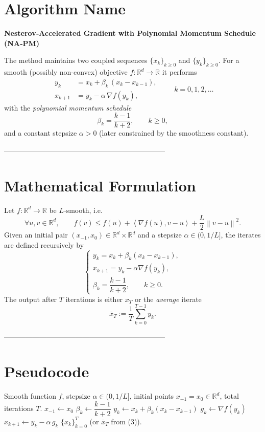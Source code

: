 \documentclass{article}
\newcommand{\R}{\mathbb{R}}
\newcommand{\norm}[1]{\left\lVert#1\right\rVert}
\newcommand{\inner}[2]{\left\langle #1,#2\right\rangle}
\begin{document}
\section*{Algorithm Name}
\textbf{Nesterov‑Accelerated Gradient with Polynomial Momentum Schedule (NA‑PM)}  

The method maintains two coupled sequences $\{x_k\}_{k\ge 0}$ and $\{y_k\}_{k\ge 0}$.
For a smooth (possibly non‑convex) objective $f:\R^d\to\R$ it performs
\[
\boxed{
\begin{aligned}
y_k      &= x_k + \beta_k\,(x_k-x_{k-1}),\\
x_{k+1}  &= y_k - \alpha\,\nabla f(y_k),
\end{aligned}}
\qquad k=0,1,2,\dots
\]
with the \emph{polynomial momentum schedule}
\[
\beta_k = \frac{k-1}{k+2},\qquad k\ge 0,
\]
and a constant stepsize $\alpha>0$ (later constrained by the smoothness constant).

--------------------------------------------------------------------

\section*{Mathematical Formulation}
Let $f:\R^d\rightarrow\R$ be $L$‑smooth, i.e.
\[
\forall u,v\in\R^d,\qquad
f(v)\le f(u)+\inner{\nabla f(u)}{v-u}+\frac{L}{2}\norm{v-u}^2 .
\tag{1}
\]
Given an initial pair $(x_{-1},x_0)\in\R^d\times\R^d$ and a stepsize $\alpha\in(0,1/L]$, the iterates are defined recursively by
\[
\begin{cases}
y_k = x_k+\beta_k (x_k-x_{k-1}),\\[2mm]
x_{k+1}=y_k-\alpha \nabla f(y_k),\\[2mm]
\beta_k=\dfrac{k-1}{k+2},\qquad k\ge 0 .
\end{cases}
\tag{2}
\]
The output after $T$ iterations is either $x_T$ or the \emph{average} iterate
\[
\bar x_T:=\frac{1}{T}\sum_{k=0}^{T-1} y_k .
\tag{3}
\]

--------------------------------------------------------------------

\section*{Pseudocode}
\begin{algorithm}[H]
\caption{NA‑PM}
\begin{algorithmic}[1]
\Require Smooth function $f$, stepsize $\alpha\in(0,1/L]$, initial points $x_{-1}=x_0\in\R^d$, total iterations $T$.
\State $x_{-1}\gets x_0$ 
    \State $\beta_k \gets \dfrac{k-1}{k+2}$ 
    \State $y_k \gets x_k + \beta_k (x_k - x_{k-1})$ 
    \State $g_k \gets \nabla f(y_k)$ 
    \State $x_{k+1} \gets y_k - \alpha\, g_k$ 
\EndFor
\State \Return $\{x_k\}_{k=0}^{T}$ (or $\bar x_T$ from (3)).
\end{algorithmic}
\end{algorithm}
\end{document}
